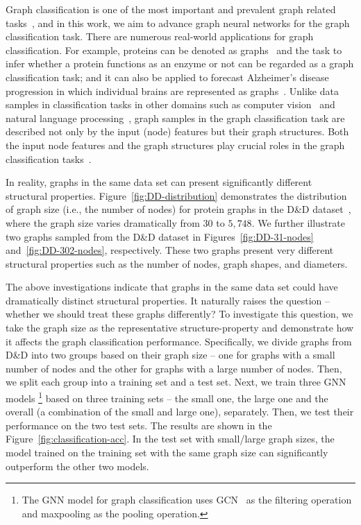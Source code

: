 \documentclass[11pt,dvipdfm]{article}
\begin{document}
Graph classification is one of the most important and prevalent graph related tasks~\cite{errica2019fair}, and in this work, we aim to advance graph neural networks for the graph classification task. 
There are numerous real-world applications for graph classification. 
For example, proteins can be denoted as graphs~\cite{dobson2003distinguishing} and the task to infer whether a protein functions as an enzyme or not can be regarded as a graph classification task; 
and it can also be applied to forecast Alzheimer's disease progression in which individual brains are represented as graphs~\cite{song2019graph}. 
Unlike data samples in classification tasks in other domains such as computer vision~\cite{rawat2017deep} and natural language processing~\cite{kowsari2019text}, graph samples in the graph classification task are described not only  by the input (node) features but their graph structures. Both the input node features and the graph structures play crucial roles in the graph classification tasks~\cite{ying2018hierarchical,ma2019graph,gao2021topology}.

In reality, graphs in the same data set can present significantly different structural properties.
Figure~\ref{fig:DD-distribution} demonstrates the distribution of graph size (i.e., the number of nodes) for protein graphs in the D\&D dataset~\cite{dobson2003distinguishing}, where the graph size varies dramatically from $30$ to $5,748$.
We further illustrate two graphs sampled from the D\&D dataset in Figures~\ref{fig:DD-31-nodes} and~\ref{fig:DD-302-nodes}, respectively. 
These two graphs present very different structural properties such as the number of nodes, graph shapes, and diameters.


The above investigations indicate that graphs in the same data set could have dramatically distinct structural properties. 
It naturally raises the question -- whether we should treat these graphs differently? 
To investigate this question, we take the graph size as the representative structure-property and demonstrate how it affects the graph classification performance. Specifically, we divide graphs from D\&D into two groups based on their graph size -- one for graphs with a small number of nodes and the other for graphs with a large number of nodes. Then, we split each group into a training set and a test set. Next, we train three GNN models \footnote {The GNN model for graph classification uses GCN~\cite{kipf2016semi} as the filtering operation and maxpooling as the pooling operation.} based on three training sets -- the small one, the large one and the overall (a combination of the small and large one), separately. Then, we test their performance on the two test sets. The results are shown in the Figure~\ref{fig:classification-acc}. 
In the test set with small/large graph sizes, the model trained on the training set with the same graph size can significantly outperform the other two models. 
\end{document}
